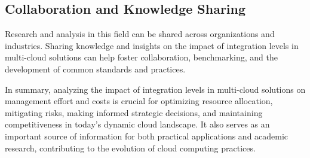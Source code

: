 \subsection*{Collaboration and Knowledge Sharing}
Research and analysis in this field can be shared across organizations and industries. 
Sharing knowledge and insights on the impact of integration levels in multi-cloud solutions can help foster collaboration, benchmarking, 
and the development of common standards and practices.

In summary, analyzing the impact of integration levels in multi-cloud solutions on management effort and costs is crucial for optimizing resource allocation, 
mitigating risks, making informed strategic decisions, and maintaining competitiveness in today's dynamic cloud landscape. 
It also serves as an important source of information for both practical applications and academic research, 
contributing to the evolution of cloud computing practices.